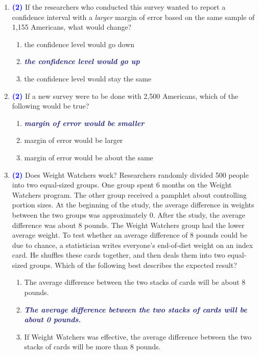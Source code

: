 \documentclass[11pt]{article}
\newcommand{\solnMult}[1]{\textbf{\textcolor{MidnightBlue}{\textit{#1}}}}	%
\newcommand{\pts}[1]{ \textbf{{\footnotesize \textcolor{blue}{(#1)}}} }	%
\begin{document}
\begin{enumerate}
%

\item \pts{2} If the researchers who conducted this survey wanted to report a confidence interval with a \emph{larger} margin of error based on the same sample of 1,155 Americans, what would change?
\begin{enumerate}
\item the confidence level would go down
\item \solnMult{the confidence level would go up}
\item the confidence level would stay the same \\
\end{enumerate}

%

\item \pts{2} \label{relaxL} If a new survey were to be done with 2,500 Americans, which of the following would be true?
\begin{enumerate}
\item \solnMult{margin of error would be smaller}
\item margin of error would be larger
\item margin of error would be about the same
\end{enumerate}

%

\pagebreak

\item \pts{2} Does Weight Watchers work? Researchers randomly divided 500 people into two equal-sized groups. One group spent 6 months on the Weight Watchers program. The other group received a pamphlet about controlling portion sizes. At the beginning of the study, the average difference in weights between the two groups was approximately 0. After the study, the average difference was about 8 pounds. The Weight Watchers group had the lower average weight. To test whether an average difference of 8 pounds could be due to chance, a statistician writes everyone's end-of-diet weight on an index card. He shuffles these cards together, and then deals them into two equal-sized groups. Which of the following best describes the expected result?

\begin{enumerate}
\item The average difference between the two stacks of cards will be about 8 pounds.
\item \solnMult{The average difference between the two stacks of cards will be about 0 pounds.}
\item If Weight Watchers was effective, the average difference between the two stacks of cards will be more than 8 pounds. \\
\end{enumerate}


\end{enumerate}
\end{document}

